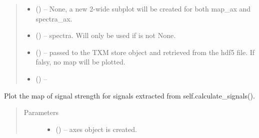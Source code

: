 \documentclass[letterpaper,10pt,english]{sphinxmanual}
\begin{document}
\begin{fulllineitems}
\begin{fulllineitems}
\begin{quote}
\begin{description}
\begin{itemize}
\item {} 
 (\sphinxstyleliteralemphasis{-}) -- None, a new 2-wide subplot will be created for both map\_ax
and spectra\_ax.

\item {} 
 (\sphinxstyleliteralemphasis{-}) -- spectra. Will only be used if  is not None.

\item {} 
 (\sphinxstyleliteralemphasis{-}) -- passed to the TXM store object and retrieved from the hdf5
file. If falsy, no map will be plotted.

\item {} 
 (\sphinxstyleliteralemphasis{-}) -- 

\end{itemize}

\end{description}\end{quote}

\end{fulllineitems}


\begin{fulllineitems}
\label{\detokenize{xanespy:xanespy.xanes_frameset.XanesFrameset.plot_mean_image}}
\end{fulllineitems}


\begin{fulllineitems}
\label{\detokenize{xanespy:xanespy.xanes_frameset.XanesFrameset.plot_signal_map}}
Plot the map of signal strength for signals extracted from
self.calculate\_signals().
\begin{quote}\begin{description}
\item[{Parameters}] \leavevmode\begin{itemize}
\item {} 
 (\sphinxstyleliteralemphasis{-}) -- axes object is created.


\end{itemize}
\end{description}
\end{quote}
\end{fulllineitems}
\end{fulllineitems}
\end{document}
